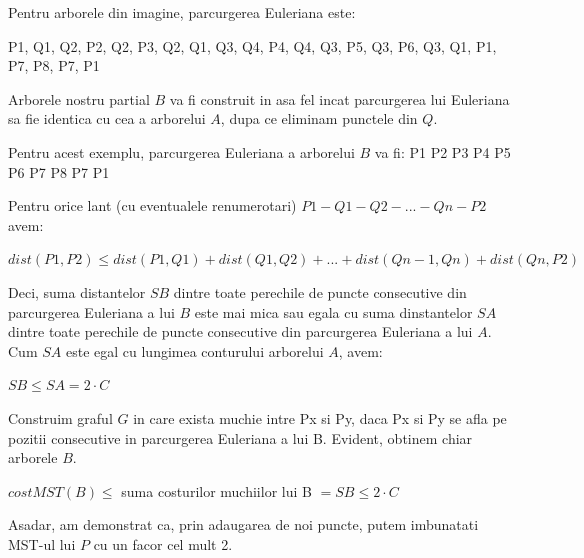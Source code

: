 \documentclass[a4paper]{article}
\begin{document}
\begin{flushleft}
Pentru arborele din imagine, parcurgerea Euleriana este:

P1, Q1, Q2, P2, Q2, P3, Q2, Q1, Q3, Q4, P4, Q4, Q3, P5, Q3, P6, Q3, Q1, P1, P7, P8, P7, P1

Arborele nostru partial $B$ va fi construit in asa fel incat parcurgerea lui Euleriana sa fie identica cu cea a arborelui $A$, dupa ce eliminam punctele din $Q$.

Pentru acest exemplu, parcurgerea Euleriana a arborelui $B$ va fi:
P1 P2 P3 P4 P5 P6 P7 P8 P7 P1

Pentru orice lant (cu eventualele renumerotari) $P1-Q1-Q2-...-Qn-P2$ avem:
\begin{center}
$dist(P1,P2) \leq dist(P1,Q1) + dist(Q1,Q2) + ... + dist(Qn-1, Qn) + dist(Qn, P2)$
\end{center}

Deci, suma distantelor $SB$ dintre toate perechile de puncte consecutive din parcurgerea Euleriana a lui $B$ este mai mica sau egala cu suma dinstantelor $SA$ dintre toate perechile de puncte consecutive din parcurgerea Euleriana a lui $A$.
Cum $SA$ este egal cu lungimea conturului arborelui $A$, avem:
\begin{center}
$SB \leq SA = 2 \cdot C$
\end{center}

Construim graful $G$ in care exista muchie intre Px si Py, daca Px si Py se afla pe pozitii consecutive in parcurgerea Euleriana a lui B. Evident, obtinem chiar arborele $B$.

\begin{center}
$cost MST(B) \leq $ suma costurilor muchiilor lui B $= SB \leq 2 \cdot C$
\end{center}

Asadar, am demonstrat ca, prin adaugarea de noi puncte, putem imbunatati MST-ul lui $P$ cu un facor cel mult 2. 


\end{flushleft}
\end{document}
